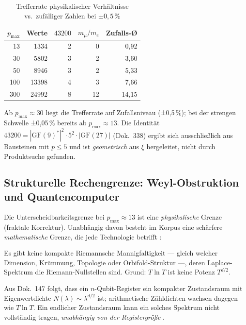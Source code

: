 \begin{table}[H]
\centering
\caption{Trefferrate physikalischer Verhältnisse vs.\ zufälliger Zahlen bei $\pm 0{,}5\,\%$}
\begin{tabular}{rrrrr}
\toprule
$p_\mathrm{max}$ & Werte & $43200$ & $m_\mu/m_e$ & Zufalls-Ø \\
\midrule
13  & 1334  & 2 & 0 & 0{,}92 \\
30  & 5802  & 3 & 2 & 3{,}60 \\
50  & 8946  & 3 & 2 & 5{,}33 \\
100 & 13398 & 4 & 3 & 7{,}66 \\
300 & 24992 & 8 & 12 & 14{,}15 \\
\bottomrule
\end{tabular}
\end{table}

Ab $p_\mathrm{max} \approx 30$ liegt die Trefferrate auf Zufallsniveau
(±0,5\,\%); bei der strengen Schwelle ±0,05\,\% bereits ab $p_\mathrm{max} \approx 13$.
Die Identität $43200 = |\mathrm{GF}(9)^*|^2 \cdot 5^2 \cdot |\mathrm{GF}(27)|$
(Dok.~338) ergibt sich ausschließlich aus Bausteinen mit $p \leq 5$ und ist
\emph{geometrisch} aus $\xi$ hergeleitet, nicht durch Produktsuche gefunden.

\subsection{Strukturelle Rechengrenze: Weyl-Obstruktion und Quantencomputer}

Die Unterscheidbarkeitsgrenze bei $p_\mathrm{max} \approx 13$ ist eine
\emph{physikalische} Grenze (fraktale Korrektur). Unabhängig davon besteht
im Korpus eine schärfere \emph{mathematische} Grenze, die jede Technologie
betrifft \BM:

\begin{keyresult}
Es gibt keine kompakte Riemannsche Mannigfaltigkeit — gleich welcher
Dimension, Krümmung, Topologie oder Orbifold-Struktur —, deren
Laplace-Spektrum die Riemann-Nullstellen sind.
Grund: $T\ln T$ ist keine Potenz $T^{d/2}$.
\end{keyresult}

Aus Dok.~147 folgt, dass ein $n$-Qubit-Register ein kompakter Zustandsraum
mit Eigenwertdichte $N(\lambda) \sim \lambda^{d/2}$ ist; arithmetische
Zähldichten wachsen dagegen wie $T \ln T$. Ein endlicher Zustandsraum kann
ein solches Spektrum nicht vollständig tragen, \emph{unabhängig von der
Registergröße} \BM.

